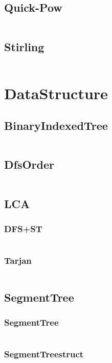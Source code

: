 \documentclass[a4paper,11pt]{article}
\begin{document}
\subsection{Quick-Pow}
\inputminted[breaklines]{c++}{02++Math/+Quick-Pow.cpp}
\subsection{Stirling}
\inputminted[breaklines]{c++}{02++Math/+Stirling.cpp}

\newpage
\section{DataStructure}
\subsection{BinaryIndexedTree}
\inputminted[breaklines]{c++}{03++DataStructure/+BinaryIndexedTree.cpp}
\subsection{DfsOrder}
\inputminted[breaklines]{c++}{03++DataStructure/+DfsOrder.cpp}
\subsection{LCA}
\subsubsection{DFS+ST}
\inputminted[breaklines]{c++}{03++DataStructure/+LCA/+DFS+ST.cpp}
\subsubsection{Tarjan}
\inputminted[breaklines]{c++}{03++DataStructure/+LCA/+Tarjan.cpp}

\subsection{SegmentTree}
\subsubsection{SegmentTree}
\inputminted[breaklines]{c++}{03++DataStructure/+SegmentTree/+SegmentTree.cpp}
\subsubsection{SegmentTreestruct}
\inputminted[breaklines]{c++}{03++DataStructure/+SegmentTree/+SegmentTreestruct.cpp}
\end{document}
